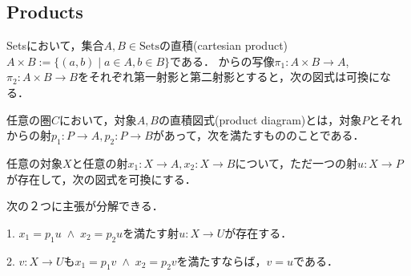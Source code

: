 \documentclass[uplatex, dvipdfmx]{jsarticle}
\begin{document}
\subsection{Products}

\begin{proposition*}
    Setsにおいて，集合$A,B\in\mathrm{Sets}$の直積(cartesian product)$A\times B:=\{ (a,b)\mid a\in A,b\in B \}$である．
    からの写像$\pi_1:A\times B\to A$,$\pi_2:A\times B\to B$をそれぞれ第一射影と第二射影とすると，次の図式は可換になる．
    \begin{center}
    \end{center}
\end{proposition*}

\begin{definition}
    任意の圏$C$において，対象$A,B$の直積図式(product diagram)とは，対象$P$とそれからの射$p_1:P\to A, p_2:P\to B$があって，次を満たすもののことである．

    任意の対象$X$と任意の射$x_1:X\to A, x_2:X\to B$について，ただ一つの射$u:X\to P$が存在して，次の図式を可換にする．
    \begin{center}
    \end{center}
\end{definition}
\begin{remark}
    次の２つに主張が分解できる．

    1. $x_1=p_1u\;\land\; x_2=p_2u$を満たす射$u:X\to U$が存在する．

    2. $v:X\to U$も$x_1=p_1v\;\land\; x_2=p_2v$を満たすならば，$v=u$である．
\end{remark}
\end{document}
